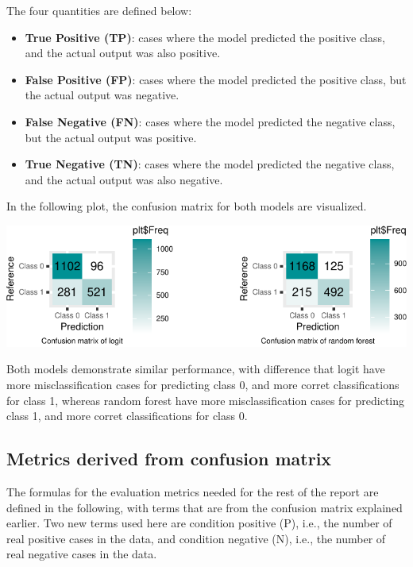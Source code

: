 \documentclass{article}
\providecommand{\tightlist}{%
  \setlength{\itemsep}{0pt}\setlength{\parskip}{0pt}}
\begin{document}
The four quantities are defined below:

\begin{itemize}
\tightlist
\item
  \textbf{True Positive (TP)}: cases where the model predicted the
  positive class, and the actual output was also positive.
\item
  \textbf{False Positive (FP)}: cases where the model predicted the
  positive class, but the actual output was negative.
\item
  \textbf{False Negative (FN)}: cases where the model predicted the
  negative class, but the actual output was positive.
\item
  \textbf{True Negative (TN)}: cases where the model predicted the
  negative class, and the actual output was also negative.
\end{itemize}

In the following plot, the confusion matrix for both models are
visualized.

\begin{center}\includegraphics{report_files/figure-latex/unnamed-chunk-18-1} \end{center}

Both models demonstrate similar performance, with difference that logit
have more misclassification cases for predicting class 0, and more
corret classifications for class 1, whereas random forest have more
misclassification cases for predicting class 1, and more corret
classifications for class 0.

\hypertarget{metrics-derived-from-confusion-matrix}{%
\subsection{Metrics derived from confusion
matrix}\label{metrics-derived-from-confusion-matrix}}

The formulas for the evaluation metrics needed for the rest of the
report are defined in the following, with terms that are from the
confusion matrix explained earlier. Two new terms used here are
condition positive (P), i.e., the number of real positive cases in the
data, and condition negative (N), i.e., the number of real negative
cases in the data.
\end{document}

